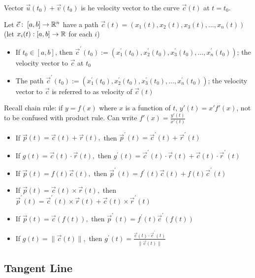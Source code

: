 Vector $\vec{u}(t_0)+\vec{v}(t_0)$ is he velocity vector to the curve $\vec{c}(t)$ at $t=t_0$.\newline

\noindent
Let $\vec{c}:\;[a,b]\rightarrow \mathbb{R}^n$ have a path $\vec{c}(t)=\left(x_{1}(t), x_{2}(t), x_{3}(t), \ldots, x_{n}(t)\right)$ (let $x_i(t):[a,b]\rightarrow \mathbb{R}$ for each $i$)
\begin{itemize}
    \item If $t_0\in[a,b]$, then $\vec{c}^{\prime}\left(t_{0}\right):=\left(x_{1}^{\prime}\left(t_{0}\right), x_{2}^{\prime}\left(t_{0}\right), x_{3}^{\prime}\left(t_{0}\right), \ldots, x_{n}^{\prime}\left(t_{0}\right)\right)$; the velocity vector to $\vec{c}$ at $t_0$
    \item The path $\vec{c}^{\prime}\left(t_{0}\right):=\left(x_{1}^{\prime}\left(t_{0}\right), x_{2}^{\prime}\left(t_{0}\right), x_{3}^{\prime}\left(t_{0}\right), \ldots, x_{n}^{\prime}\left(t_{0}\right)\right)$; the velocity vector to $\vec{c}$ is referred to as velocity of $\vec{c}(t)$
\end{itemize}

Recall chain rule: if $y=f(x)$ where $x$ is a function of $t$, $y'(t)=x'f'(x)$, not to be confused with product rule.
Can write $f'(x)=\frac{y'(t)}{x'(t)}$

\begin{itemize}
    \item If $\vec{p}(t)=\vec{c}(t)+\vec{r}(t),$ then $\vec{p}^{\prime}(t)=\vec{c}^{\prime}(t)+\vec{r}^{\prime}(t)$
    \item If $g(t)=\vec{c}(t) \cdot \vec{r}(t),$ then $g^{\prime}(t)=\vec{c}^{\prime}(t) \cdot \vec{r}(t)+\vec{c}(t) \cdot \vec{r}^{\prime}(t)$
    \item If $\vec{p}(t)=f(t) \vec{c}(t),$ then $\vec{p}^{\prime}(t)=f^{\prime}(t) \vec{c}(t)+f(t) \vec{c}^{\prime}(t)$
    \item If $\vec{p}(t)=\vec{c}(t) \times \vec{r}(t),$ then $\vec{p}^{\prime}(t)=\vec{c}^{\prime}(t) \times \vec{r}(t)+\vec{c}(t) \times \vec{r}^{\prime}(t)$
    \item If $\vec{p}(t)=\vec{c}(f(t)),$ then $\vec{p}^{\prime}(t)=f^{\prime}(t) \vec{c}^{\prime}(f(t))$
    \item If $g(t)=\|\vec{c}(t)\|,$ then $g^{\prime}(t)=\frac{\vec{c}(t) \cdot \vec{c}^{\prime}(t)}{\|\vec{c}(t)\|}$
\end{itemize}

\subsection{Tangent Line}

